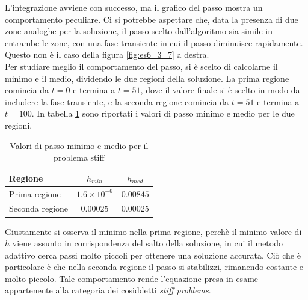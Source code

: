 \documentclass[letterpaper, 12pt]{article}
\numberwithin{equation}{section}    %
\begin{document}
L'integrazione avviene con successo, ma il grafico del passo mostra un comportamento peculiare. Ci si potrebbe
aspettare che, data la presenza di due zone analoghe per la soluzione, il passo scelto dall'algoritmo
sia simile in entrambe le zone, con una fase transiente in cui il passo diminuisce rapidamente.
Questo non è il caso della figura \ref{fig:es6_3_7} a destra.\\
Per studiare meglio il comportamento del passo, si è scelto di calcolarne il minimo e il medio, 
dividendo le due regioni della soluzione. La prima regione comincia da $t=0$ e termina a $t=51$, dove
il valore finale si è scelto in modo da includere la fase transiente, e la seconda regione comincia da $t=51$ 
e termina a $t=100$.
In tabella \ref{tab:passi_stiff} sono riportati i valori di passo minimo e medio per le due regioni. \\
\begin{table}[!ht]
    \centering
    \caption{Valori di passo minimo e medio per il problema stiff}
    \label{tab:passi_stiff}
    \begin{tabular}{|l|c|c|}
        \hline
        \textbf{Regione} & \textbf{$h_{min}$} & \textbf{$h_{med}$} \\
        \hline
        Prima regione & $1.6 \times 10^{-6}$ & $0.00845$ \\
        Seconda regione & $0.00025$ & $ 0.00025$ \\
        \hline
    \end{tabular}
\end{table}
Giustamente si osserva il minimo nella prima regione, perchè il minimo valore di $h$ viene assunto in 
corrispondenza del salto della soluzione, in cui il metodo adattivo cerca passi molto piccoli per 
ottenere una soluzione accurata. Ciò che è particolare è che nella seconda regione il passo si stabilizzi, 
rimanendo costante e molto piccolo. Tale comportamento rende l'equazione presa in esame appartenente alla 
categoria dei cosiddetti \textit{stiff problems}. 
\end{document}
